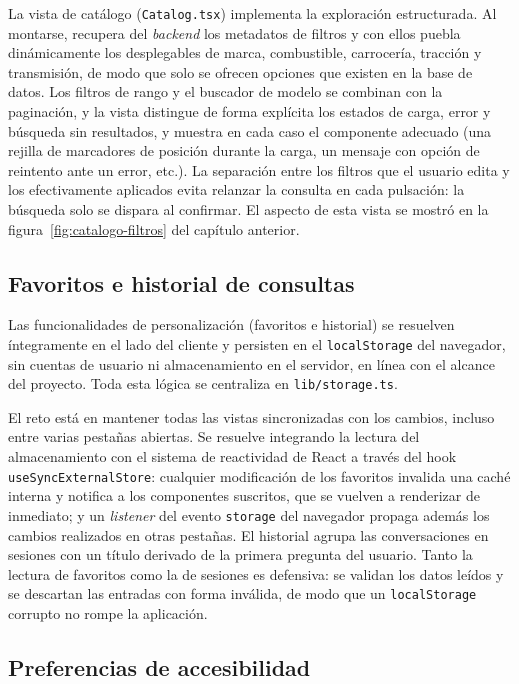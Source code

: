 La vista de catálogo (\texttt{Catalog.tsx}) implementa la exploración
estructurada. Al montarse, recupera del \emph{backend} los metadatos de filtros y
con ellos puebla dinámicamente los desplegables de marca, combustible, carrocería,
tracción y transmisión, de modo que solo se ofrecen opciones que existen en la base
de datos. Los filtros de rango y el buscador de modelo se combinan con la
paginación, y la vista distingue de forma explícita los estados de carga, error y
búsqueda sin resultados, y muestra en cada caso el componente adecuado (una rejilla
de marcadores de posición durante la carga, un mensaje con opción de reintento ante
un error, etc.). La separación entre los filtros que el usuario edita y los
efectivamente aplicados evita relanzar la consulta en cada pulsación: la búsqueda
solo se dispara al confirmar. El aspecto de esta vista se mostró en la
figura~\ref{fig:catalogo-filtros} del capítulo anterior.

\subsection{Favoritos e historial de consultas}
\label{sec:impl-frontend-persistencia}

Las funcionalidades de personalización (favoritos e historial) se resuelven
íntegramente en el lado del cliente y persisten en el \texttt{localStorage} del
navegador, sin cuentas de usuario ni almacenamiento en el servidor, en línea con el
alcance del proyecto. Toda esta lógica se centraliza en \texttt{lib/storage.ts}.

El reto está en mantener todas las vistas sincronizadas con los cambios, incluso
entre varias pestañas abiertas. Se resuelve integrando la lectura del
almacenamiento con el sistema de reactividad de React a través del hook
\texttt{useSyncExternalStore}: cualquier modificación de los favoritos invalida una
caché interna y notifica a los componentes suscritos, que se vuelven a renderizar de
inmediato; y un \emph{listener} del evento \texttt{storage} del navegador propaga
además los cambios realizados en otras pestañas. El historial agrupa las
conversaciones en sesiones con un título derivado de la primera pregunta del
usuario. Tanto la lectura de favoritos como la de sesiones es defensiva: se validan
los datos leídos y se descartan las entradas con forma inválida, de modo que un
\texttt{localStorage} corrupto no rompe la aplicación.

\subsection{Preferencias de accesibilidad}
\label{sec:impl-frontend-preferencias}

